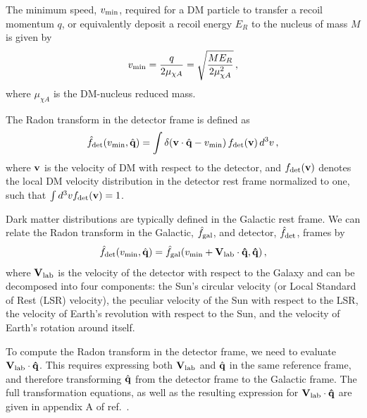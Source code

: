 \documentclass[a4paper,11pt]{article}
\begin{document}
The minimum  speed, $v_{\rm min}$, required for a DM particle to transfer a recoil momentum $q$,  or equivalently deposit a recoil energy $E_R$ to the nucleus of mass $M$ is given by
\begin{equation}
v_{\rm min}= \frac{q}{2\mu_{\chi A}} =\sqrt{\frac{M E_R}{2\mu_{\chi A}^2}}\,,
\end{equation}
where $\mu_{\chi A}$ is the DM-nucleus reduced mass. 


The Radon transform in the detector frame is defined as~\cite{Gondolo:2002np} 
\begin{equation}
    \hat{f}_{\rm det}(v_{\rm min},\hat{\mathbf{q}}) = \int \delta(\mathbf{v}\cdot\hat{\mathbf{q}} - v_{\rm min})\,f_{\rm det}(\mathbf{v})\,d^3v\, ,
    \label{eq:Radon_transform}
\end{equation}
where ${\bf v}$ is the velocity of DM with respect to the detector, and $f_{\rm{det}}(\mathbf{v})$ denotes the local DM velocity distribution in the detector rest frame normalized to one, such that $\int d^3 v f_{\rm det}({\bf v})=1$.



Dark matter distributions are typically defined in the Galactic rest frame. We can relate the Radon transform in the Galactic, $\hat{f}_{\rm{gal}}$, and detector, $\hat{f}_{\rm{det}}$, frames by~\cite{Gondolo:2002np}
\begin{equation}
    \hat{f}_{\rm{det}} (v_{\rm min},\hat{\bf{q}}) = \hat{f}_{\rm{gal}}(v_{\rm min} + \bf{V}_{\rm{lab}}\cdot \hat{\bf{q}},\hat{\bf{q}})\,,
    \label{eq:radon_lab}
\end{equation}
where $\bf{V}_{\rm{lab}}$ is the velocity of the detector with respect to the Galaxy and can be decomposed into four components: the Sun's circular velocity (or Local Standard of Rest (LSR) velocity), the peculiar velocity of the Sun with respect to the LSR, the velocity of Earth's revolution with respect to the Sun, and the velocity of Earth's rotation around itself. 

To compute the Radon transform in the detector frame, we  need to evaluate $\bf{V}_{\rm{lab}}\cdot \hat{\bf{q}}$. This requires expressing both $\bf{V}_{\rm{lab}}$ and $\hat{\bf{q}}$ in the same reference frame, and therefore transforming $\hat{\bf{q}}$ from the detector frame to the Galactic frame. The full transformation equations, as well as the resulting expression for $\bf{V}_{\rm{lab}}\cdot \hat{\bf{q}}$ are given in appendix A of ref.~\cite{Bozorgnia:2011vc}. 
\end{document}
